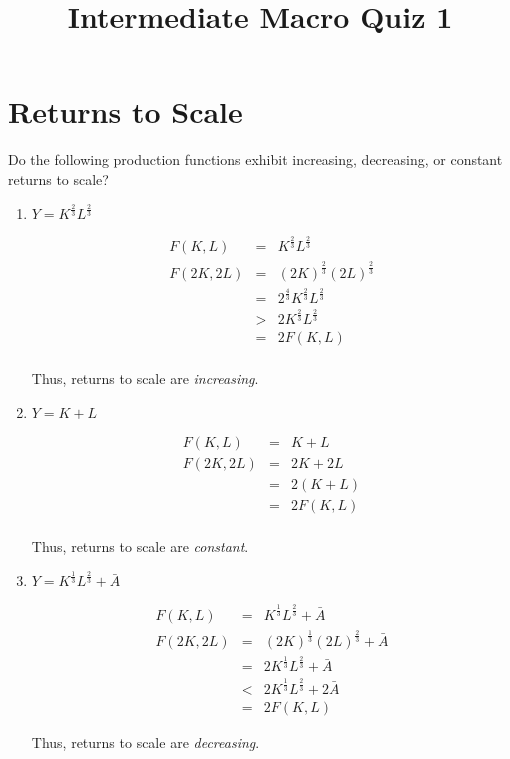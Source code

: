 \documentclass{article}
\begin{document}
\title{Intermediate Macro Quiz 1}

\maketitle

\section{Returns to Scale}

Do the following production functions exhibit increasing, decreasing, or constant returns to scale?

\begin{enumerate}
\item $Y = K^{\frac23} L^{\frac23}$

\color{red}

\begin{eqnarray*}
F(K, L) & = & K^{\frac23} L^{\frac23} \\
F(2K, 2L) & = & (2K)^{\frac23} (2L)^{\frac23} \\
 & = & 2^{\frac43} K^{\frac23} L^{\frac23} \\
 & > & 2 K^{\frac23} L^{\frac23} \\
 & = & 2 F(K, L) \\
\end{eqnarray*}

Thus, returns to scale are \textit{increasing}.

\color{black}

\item $Y = K + L$

\color{red}

\begin{eqnarray*}
F(K, L) & = & K + L \\
F(2K, 2L) & = & 2K + 2L \\
 & = & 2(K+L) \\
 & = & 2 F(K, L) \\
\end{eqnarray*}

Thus, returns to scale are \textit{constant}.

\color{black}

\item $Y = K^{\frac13} L^{\frac23} + \bar{A}$

\color{red}

\begin{eqnarray*}
F(K, L) & = & K^{\frac13} L^{\frac23} + \bar{A} \\
F(2K, 2L) & = & (2K)^{\frac13} (2L)^{\frac23} + \bar{A} \\
 & = & 2K^{\frac13} L^{\frac23} + \bar{A} \\
 & < & 2K^{\frac13} L^{\frac23} + 2\bar{A} \\
 & = & 2F(K, L)
\end{eqnarray*}

Thus, returns to scale are \textit{decreasing}.

\color{black}

\end{enumerate}
\end{document}

